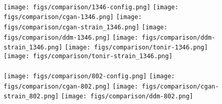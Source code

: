 

\begin{figure}[!h]
\centering
\begin{graybox}
    \hspace{0.3cm}
    \hspace{0.3cm}
    \hspace{0.3cm}
    \\
    \texttt{[image: figs/comparison/1346-config.png]}\hspace{0.3cm}
    \texttt{[image: figs/comparison/cgan-1346.png]}\hspace{0.06cm}
    \texttt{[image: figs/comparison/cgan-strain\_1346.png]}\hspace{0.3cm}
    \texttt{[image: figs/comparison/ddm-1346.png]}\hspace{0.06cm}
    \texttt{[image: figs/comparison/ddm-strain\_1346.png]}\hspace{0.3cm}
    \texttt{[image: figs/comparison/tonir-1346.png]}\hspace{0.06cm}
    \texttt{[image: figs/comparison/tonir-strain\_1346.png]}
    \vspace{-1pt}
    \\
    \hspace{0.3cm}
    \hspace{0.06cm}
    \hspace{0.3cm}
    \hspace{0.06cm}
    \hspace{0.3cm}
    \hspace{0.06cm}
    \vspace{2pt}
    \\
    \texttt{[image: figs/comparison/802-config.png]}\hspace{0.3cm}
    \texttt{[image: figs/comparison/cgan-802.png]}\hspace{0.06cm}
    \texttt{[image: figs/comparison/cgan-strain\_802.png]}\hspace{0.3cm}
    \texttt{[image: figs/comparison/ddm-802.png]}\hspace{0.06cm}

\end{graybox}
\end{figure}
